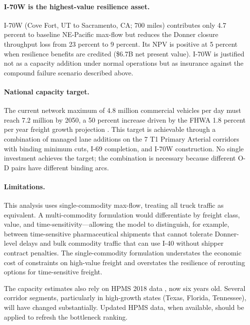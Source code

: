 \paragraph{I-70W is the highest-value resilience asset.} I-70W (Cove Fort, UT to Sacramento, CA; 700 miles) contributes only 4.7 percent to baseline NE-Pacific max-flow but reduces the Donner closure throughput loss from 23 percent to 9 percent. Its NPV is positive at 5 percent when resilience benefits are credited (\$6.7B net present value). I-70W is justified not as a capacity addition under normal operations but as insurance against the compound failure scenario described above.

\paragraph{National capacity target.} The current network maximum of 4.8 million commercial vehicles per day must reach 7.2 million by 2050, a 50 percent increase driven by the FHWA 1.8 percent per year freight growth projection \citep{FHWA_freight2023}. This target is achievable through a combination of managed lane additions on the 7 T1 Primary Arterial corridors with binding minimum cuts, I-69 completion, and I-70W construction. No single investment achieves the target; the combination is necessary because different O-D pairs have different binding arcs.

\paragraph{Limitations.} This analysis uses single-commodity max-flow, treating all truck traffic as equivalent. A multi-commodity formulation would differentiate by freight class, value, and time-sensitivity---allowing the model to distinguish, for example, between time-sensitive pharmaceutical shipments that cannot tolerate Donner-level delays and bulk commodity traffic that can use I-40 without shipper contract penalties. The single-commodity formulation understates the economic cost of constraints on high-value freight and overstates the resilience of rerouting options for time-sensitive freight.

The capacity estimates also rely on HPMS 2018 data \citep{HPMS2018}, now six years old. Several corridor segments, particularly in high-growth states (Texas, Florida, Tennessee), will have changed substantially. Updated HPMS data, when available, should be applied to refresh the bottleneck ranking.

